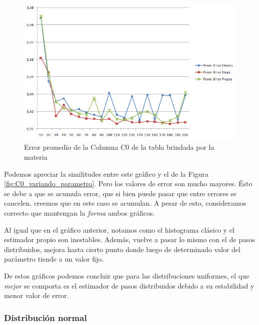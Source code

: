 \begin{itemize}
\begin{figure}[H]
	  \begin{center}
	    \includegraphics[scale=.80]{imagenes/parametroVariableC0Greater.png}
	    \caption{Error promedio de la Columna C0 de la tabla brindada por la materia} 
	    \label{fig:C0_variando_parametro_greater}
	  \end{center}
\end{figure}

\quad Podemos apreciar la similitudes entre este gr\'afico y el de la Figura	 \ref{fig:C0_variando_parametro}. Pero los valores de error son mucho mayores. \'Esto se debe a que se acumula error, que si bien puede pasar que entre errores se cancelen, creemos que en este caso se acumulan. A pesar de esto, consideramos correcto que mantengan la \textit{forma} ambos gr\'aficos.

\quad Al igual que en el gr\'afico anterior, notamos como el histograma cl\'asico y el estimador propio son inestables. Adem\'as, vuelve a pasar lo mismo con el de pasos distribuidos, mejora hasta cierto punto donde luego de determinado valor del par\'ametro tiende a un valor fijo.

\quad De estos gr\'aficos podemos concluir que para las distribuciones uniformes, el que \textit{mejor} se comporta es el estimador de pasos distribuidos debido a su estabilidad y menor valor de error.

\end{itemize}

\subsubsection{Distribuci\'on normal}


